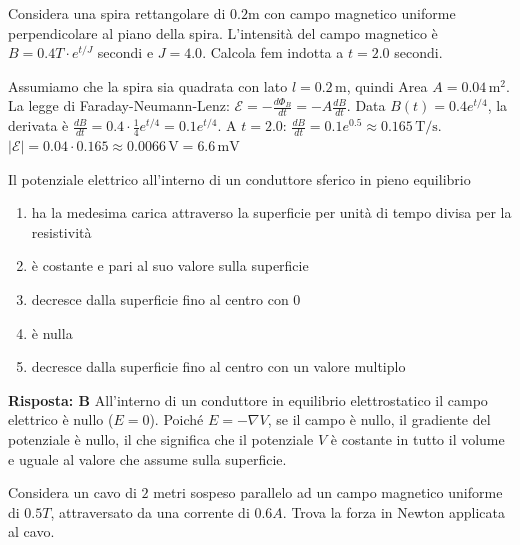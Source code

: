 \documentclass[a4paper]{article}
\begin{document}
\begin{snippetexercise}{}
    Considera una spira rettangolare di \(0.2 \text{m}\) con campo magnetico uniforme perpendicolare
    al piano della spira. L'intensità del campo magnetico è \(B = 0.4 T \cdot e^{t/J}\) secondi e
    \(J = 4.0\). Calcola fem indotta a \(t = 2.0\) secondi.
\end{snippetexercise}
\begin{snippetsolution}{}
    Assumiamo che la spira sia quadrata con lato \(l=0.2\,\text{m}\), quindi Area \(A = 0.04\,\text{m}^2\).
    La legge di Faraday-Neumann-Lenz: \(\mathcal{E} = - \frac{d\Phi_B}{dt} = -A \frac{dB}{dt}\).
    Data \(B(t) = 0.4 e^{t/4}\), la derivata è \(\frac{dB}{dt} = 0.4 \cdot \frac{1}{4} e^{t/4} = 0.1 e^{t/4}\).
    A \(t=2.0\): \(\frac{dB}{dt} = 0.1 e^{0.5} \approx 0.165 \, \text{T/s}\).
    \(|\mathcal{E}| = 0.04 \cdot 0.165 \approx 0.0066 \, \text{V} = 6.6 \, \text{mV}\)
\end{snippetsolution}
\begin{snippetexercise}{}
    Il potenziale elettrico all'interno di un conduttore sferico in pieno equilibrio
    \begin{enumerate}[label=\Alph*, nosep]
        \item ha la medesima carica attraverso la superficie per unità di tempo divisa per la resistività
        \item è costante e pari al suo valore sulla superficie
        \item decresce dalla superficie fino al centro con 0
        \item è nulla
        \item decresce dalla superficie fino al centro con un valore multiplo
    \end{enumerate}
\end{snippetexercise}
\begin{snippetsolution}{}
    \textbf{Risposta: B}
    All'interno di un conduttore in equilibrio elettrostatico il campo elettrico è nullo (\(E=0\)). Poiché \(E = -\nabla V\), se il campo è nullo, il gradiente del potenziale è nullo, il che significa che il potenziale \(V\) è costante in tutto il volume e uguale al valore che assume sulla superficie.
\end{snippetsolution}
\begin{snippetexercise}{}
    Considera un cavo di \(2\) metri sospeso parallelo ad un campo magnetico uniforme di \(0.5 T\),
    attraversato da una corrente di \(0.6 A\). Trova la forza in Newton applicata al cavo.
\end{snippetexercise}
\end{document}

